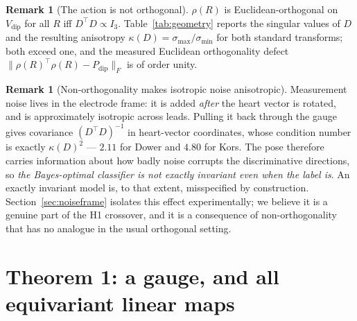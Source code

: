 \documentclass[11pt]{article}
\theoremstyle{definition}
\newtheorem{remark}[theorem]{Remark}
\newcommand{\Vdip}{V_{\mathrm{dip}}}
\newcommand{\rhoext}{\rho}
\begin{document}
\begin{remark}[The action is not orthogonal]
$\rhoext(R)$ is Euclidean-orthogonal on $\Vdip$ for all $R$ iff $D^{\top}D \propto
I_3$. Table~\ref{tab:geometry} reports the singular values of $D$ and the resulting
anisotropy $\kappa(D) = \sigma_{\max}/\sigma_{\min}$ for both standard transforms;
both exceed one, and the measured Euclidean orthogonality defect
$\|\rhoext(R)^{\top}\rhoext(R) - P_{\mathrm{dip}}\|_F$ is of order unity.
\end{remark}

\begin{table}[t]\centering
\caption{Lead geometry for two standard transforms. $\kappa(D)$ is the anisotropy of
the transform and $\kappa(M)$ the condition number of the invariant metric. The
Euclidean defect is $\|\rhoext^{\top}\rhoext - P_{\mathrm{dip}}\|_F$; the $M$ defect is
$\|\rhoext^{\top}M\rhoext - M\|_F$, zero by Theorem~\ref{thm:gauge}. The effect is not
an artefact of one transform.}
\label{tab:geometry}

\end{table}

\begin{remark}[Non-orthogonality makes isotropic noise anisotropic]\label{rem:noise}
Measurement noise lives in the electrode frame: it is added \emph{after} the heart
vector is rotated, and is approximately isotropic across leads. Pulling it back
through the gauge gives covariance $(D^{\top}D)^{-1}$ in heart-vector coordinates,
whose condition number is exactly $\kappa(D)^2$ --- $2.11$ for Dower and $4.80$ for
Kors. The pose therefore carries information about how badly noise corrupts the
discriminative directions, so \emph{the Bayes-optimal classifier is not exactly
invariant even when the label is}. An exactly invariant model is, to that extent,
misspecified by construction. Section~\ref{sec:noiseframe} isolates this effect
experimentally; we believe it is a genuine part of the H1 crossover, and it is a
consequence of non-orthogonality that has no analogue in the usual orthogonal setting.
\end{remark}

\section{Theorem 1: a gauge, and all equivariant linear maps}\label{sec:gauge}
\end{document}
